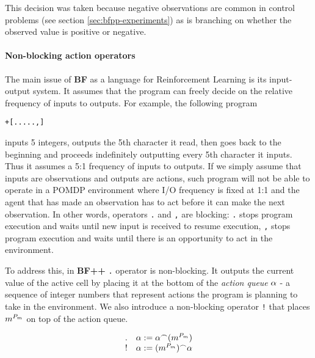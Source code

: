 This decision was taken because negative observations are common in control problems (see section \ref{sec:bfpp-experiments}) as is branching on whether the observed value is positive or negative. 

\paragraph{Non-blocking action operators}
\label{sec:queue}


The main issue of \textbf{BF} as a language for Reinforcement Learning is its input-output system.
It assumes that the program can freely decide on the relative frequency of inputs to outputs.
For example, the following program

\begin{center}
\begin{lstlisting}
+[.....,]
\end{lstlisting}
\end{center}

inputs 5 integers, outputs the 5th character it read, then goes back to the beginning and proceeds indefinitely outputting every 5th character it inputs.
Thus it assumes a 5:1 frequency of inputs to outputs.
If we simply assume that inputs are observations and outputs are actions, such program will not be able to operate in a POMDP environment where I/O frequency is fixed at 1:1 and the agent that has made an observation has to act before it can make the next observation.
In other words, operators \texttt{.} and \texttt{,} are blocking: \texttt{.} stops program execution and waits until new input is received to resume execution, \texttt{,} stops program execution and waits until there is an opportunity to act in the environment.

To address this, in \textbf{BF++} \texttt{.} operator is non-blocking.
It outputs the current value of the active cell by placing it at the bottom of the \textit{action queue} $\alpha$ - a sequence of integer numbers that represent actions the program is planning to take in the environment. We also introduce a non-blocking operator \texttt{!} that places $m^{P_m}$ on top of the action queue.

\begin{equation}
    \begin{array}{cc}
         . & \alpha := \alpha^\frown (m^{P_m}) \\
         ! & \alpha := (m^{P_m})^\frown \alpha
    \end{array}
\end{equation}

